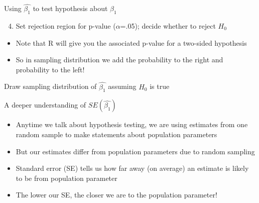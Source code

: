 \documentclass[
  8pt,
  ignorenonframetext,
  dvipsnames]{beamer}
\providecommand{\tightlist}{%
  \setlength{\itemsep}{0pt}\setlength{\parskip}{0pt}}
\let\olditem\item
\renewcommand{\item}{%
  \olditem\vspace{4pt}
}
\begin{document}
\begin{frame}{Using \(\hat{\beta_1}\) to test hypothesis about
\(\beta_1\)}
\protect\hypertarget{using-hatbeta_1-to-test-hypothesis-about-beta_1-2}{}

\begin{enumerate}
\setcounter{enumi}{3}
\tightlist
\item
  Set rejection region for p-value (\(\alpha\)=.05); decide whether to
  reject \(H_0\)
\end{enumerate}

\begin{itemize}
\tightlist
\item
  Note that R will give you the associated p-value for a two-sided
  hypothesis
\item
  So in sampling distribution we add the probability to the right and
  probability to the left!
\end{itemize}

\medskip

Draw sampling distribution of \(\hat{\beta_1}\) assuming \(H_0\) is true

\end{frame}

\begin{frame}{A deeper understanding of \(SE(\hat{\beta_1})\)}
\protect\hypertarget{a-deeper-understanding-of-sehatbeta_1}{}

\begin{itemize}
\item
  Anytime we talk about hypothesis testing, we are using estimates from
  one random sample to make statements about population parameters
\item
  But our estimates differ from population parameters due to random
  sampling
\item
  Standard error (SE) tells us how far away (on average) an estimate is
  likely to be from population parameter
\item
  The lower our SE, the closer we are to the population parameter!
\end{itemize}

\end{frame}
\end{document}
